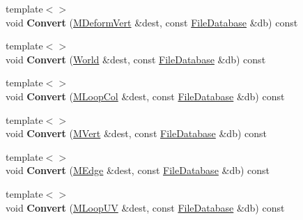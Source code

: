 \begin{DoxyCompactItemize}
\item 
\hypertarget{class_assimp_1_1_blender_1_1_structure_a9c5edb5cce1a7e3e9097e7240ed371a2}{{\footnotesize template$<$$>$ }\\void {\bfseries Convert} (\hyperlink{struct_assimp_1_1_blender_1_1_m_deform_vert}{M\+Deform\+Vert} \&dest, const \hyperlink{class_assimp_1_1_blender_1_1_file_database}{File\+Database} \&db) const }\label{class_assimp_1_1_blender_1_1_structure_a9c5edb5cce1a7e3e9097e7240ed371a2}

\item 
\hypertarget{class_assimp_1_1_blender_1_1_structure_a419e150d969067ca3e9ba39769f62d06}{{\footnotesize template$<$$>$ }\\void {\bfseries Convert} (\hyperlink{struct_assimp_1_1_blender_1_1_world}{World} \&dest, const \hyperlink{class_assimp_1_1_blender_1_1_file_database}{File\+Database} \&db) const }\label{class_assimp_1_1_blender_1_1_structure_a419e150d969067ca3e9ba39769f62d06}

\item 
\hypertarget{class_assimp_1_1_blender_1_1_structure_aabaf340a66b8efd9b808f2ff224d56fd}{{\footnotesize template$<$$>$ }\\void {\bfseries Convert} (\hyperlink{struct_assimp_1_1_blender_1_1_m_loop_col}{M\+Loop\+Col} \&dest, const \hyperlink{class_assimp_1_1_blender_1_1_file_database}{File\+Database} \&db) const }\label{class_assimp_1_1_blender_1_1_structure_aabaf340a66b8efd9b808f2ff224d56fd}

\item 
\hypertarget{class_assimp_1_1_blender_1_1_structure_a4395bdf3148f9f3e85a57f0cffd06295}{{\footnotesize template$<$$>$ }\\void {\bfseries Convert} (\hyperlink{struct_assimp_1_1_blender_1_1_m_vert}{M\+Vert} \&dest, const \hyperlink{class_assimp_1_1_blender_1_1_file_database}{File\+Database} \&db) const }\label{class_assimp_1_1_blender_1_1_structure_a4395bdf3148f9f3e85a57f0cffd06295}

\item 
\hypertarget{class_assimp_1_1_blender_1_1_structure_aed54929a37a747d9eaf0d5031e1856f1}{{\footnotesize template$<$$>$ }\\void {\bfseries Convert} (\hyperlink{struct_assimp_1_1_blender_1_1_m_edge}{M\+Edge} \&dest, const \hyperlink{class_assimp_1_1_blender_1_1_file_database}{File\+Database} \&db) const }\label{class_assimp_1_1_blender_1_1_structure_aed54929a37a747d9eaf0d5031e1856f1}

\item 
\hypertarget{class_assimp_1_1_blender_1_1_structure_a07a103488b5b73cdbe60b9758aa917a2}{{\footnotesize template$<$$>$ }\\void {\bfseries Convert} (\hyperlink{struct_assimp_1_1_blender_1_1_m_loop_u_v}{M\+Loop\+U\+V} \&dest, const \hyperlink{class_assimp_1_1_blender_1_1_file_database}{File\+Database} \&db) const }\label{class_assimp_1_1_blender_1_1_structure_a07a103488b5b73cdbe60b9758aa917a2}


\end{DoxyCompactItemize}
